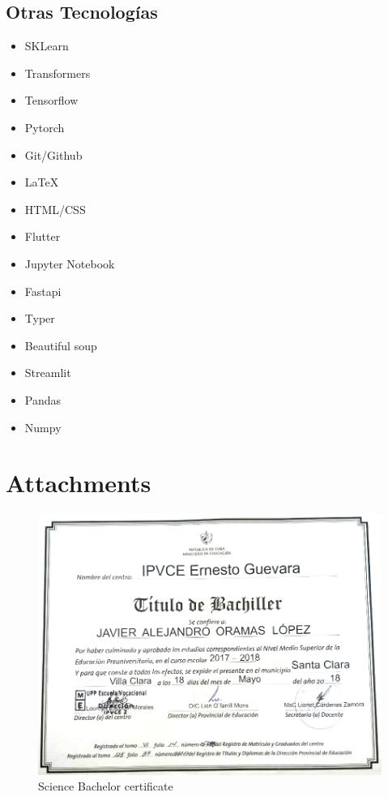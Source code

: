 \documentclass{article}
\begin{document}
\begin{multicols}{2}
\section*{Otras Tecnologías}
\begin{itemize}
    \item SKLearn
    \item Transformers
    \item Tensorflow
    \item Pytorch
    \item Git/Github
    \item LaTeX
    \item HTML/CSS
    \item Flutter
    \item Jupyter Notebook
    \item Fastapi
    \item Typer
    \item Beautiful soup
    \item Streamlit
    \item Pandas
    \item Numpy
\end{itemize}

\end{multicols}

\newpage
\section*{Attachments}
\begin{figure}[h]
    \includegraphics[width=\textwidth]{images/bachelor.png}
    \caption{Science Bachelor certificate}
    \label{sec:bachelor}
\end{figure}
\end{document}
